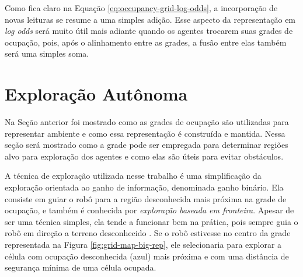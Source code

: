 Como fica claro na Equação \ref{eq:occupancy-grid-log-odds}, a 
incorporação de novas leituras se resume a uma simples adição. Esse 
aspecto da representação em \textit{log odds} será muito útil mais 
adiante quando os agentes trocarem suas grades de ocupação, pois, após 
o alinhamento entre as grades, a fusão entre elas também será uma simples 
soma.

\section{Exploração Autônoma}

Na Seção anterior foi mostrado como as grades de ocupação são utilizadas 
para representar ambiente e como essa representação é construída e 
mantida. Nessa seção será mostrado como a grade pode ser empregada para 
determinar regiões alvo para exploração dos agentes e como elas são 
úteis para evitar obstáculos.

A técnica de exploração utilizada nesse trabalho é uma simplificação 
da exploração orientada ao ganho de informação, denominada ganho binário. 
Ela consiste em guiar o robô para a região desconhecida mais próxima 
na grade de ocupação, e também é conhecida por \emph{exploração baseada em fronteira}. Apesar de ser uma técnica simples, ela tende a funcionar 
bem na prática, pois sempre guia o robô em direção a terreno desconhecido 
\cite[p.~584]{thrun2005probabilistic}. Se o robô estivesse no centro 
da grade representada na Figura \ref{fig:grid-map-big-rep}, ele 
selecionaria para explorar a célula com ocupação desconhecida (azul) mais próxima e com uma distância de segurança mínima de uma célula ocupada.

